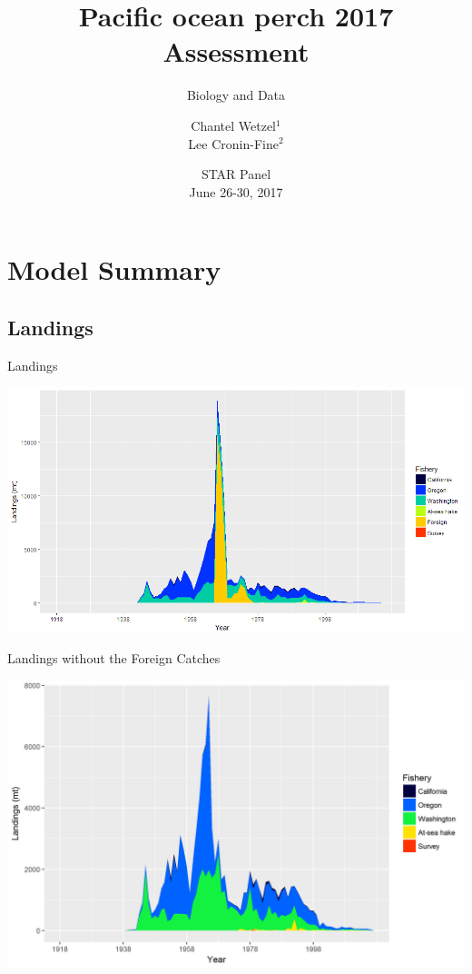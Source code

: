 \documentclass[pdf]{beamer}\usepackage[]{graphicx}\usepackage[]{color}
\title{Pacific ocean perch 2017 Assessment}
\subtitle{Biology and Data}
\author{Chantel Wetzel$^{1}$\\
        Lee Cronin-Fine$^{2}$}
\institute[NWFSC]{
Northwest Fisheries Science Center$^1$ \\
University of Washington$^2$ \\
\medskip
}
\date{{\footnotesize STAR Panel \\ June 26-30, 2017}}
\begin{document}
\begin{frame}
  \titlepage
\end{frame}


\section{Model Summary}
\subsection{Landings}
\begin{frame}{Landings}
  \begin{center}
    \includegraphics[scale = 0.40]{figures/catches.png}
  \end{center}
\end{frame}

\begin{frame}{Landings without the Foreign Catches}
  \begin{center}
    \includegraphics[scale = 0.40]{figures/POP_Landings_wo_Foreign.png}
  \end{center}
\end{frame}
\end{document}
